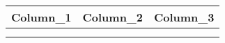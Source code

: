 
\begin{table}[h]
\begin{tabular}{ccc}
\hline
Column\_1 & Column\_2 & Column\_3 \\ \hline
          &           &           \\
          &           &           \\ \hline
\end{tabular}
\end{table}
